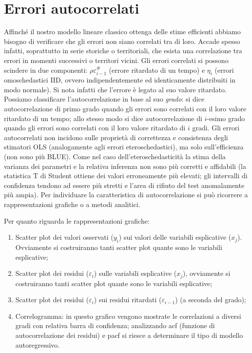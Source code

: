 \documentclass[a4page, 11pt]{article} %
\begin{document}
\section{Errori autocorrelati}

Affinché il nostro modello lineare classico ottenga delle stime efficienti abbiamo bisogno di verificare che gli errori non siano correlati tra di loro.
Accade spesso infatti, soprattutto in serie storiche o territoriali, che esista una correlazione tra errori in momenti successivi o territori vicini.
Gli errori correlati si possono scindere in due componenti: $\rho \varepsilon_{i-1}^{\#}$ (errore ritardato di un tempo) e $\eta_i$ (errori omoschedastici IID, ovvero indipendentemente ed identicamente distribuiti in modo normale).
Si nota infatti che l’errore è legato al suo valore ritardato.
Possiamo classificare l’autocorrelazione in base al suo \textit{grado}: si dice autocorrelazione di primo grado quando gli errori sono correlati con il loro valore ritardato di un tempo; allo stesso modo si dice autocorrelazione di $i$-esimo grado quando gli errori sono correlati con il loro valore ritardato di $i$ gradi. Gli errori autocorrelati non incidono sulle proprietà di correttezza e consistenza degli stimatori OLS (analogamente agli errori eteroschedastici), ma solo sull’efficienza (non sono più BLUE). Come nel caso dell’eteroschedasticità la stima della varianza dei parametri e la relativa inferenza non sono più corretti e affidabili (la statistica T di Student ottiene dei valori erroneamente più elevati; gli intervalli di confidenza tendono ad essere più stretti e l'area di rifiuto del test anomalamente più ampia).
Per individuare la caratteristica di autocorrelazione si può ricorrere a rappresentazioni grafiche o a metodi analitici.

Per quanto riguarda le rappresentazioni grafiche:
\begin{enumerate}[noitemsep]
\item Scatter plot dei valori osservati ($y_i$) sui valori delle variabili esplicative ($x_j$). Ovviamente si costruiranno tanti scatter plot quante sono le variabili esplicative;
\item Scatter plot dei residui ($\varepsilon_i$) sulle variabili esplicative ($x_j$), ovviamente si costruiranno tanti scatter plot quante sono le variabili esplicative;
\item Scatter plot dei residui ($\varepsilon_i$) sui residui ritardati ($\varepsilon_{i-1}$) (a seconda del grado);
\item Correlogramma: in questo grafico vengono mostrate le correlazioni a diversi gradi con relativa barra di confidenza; analizzando acf (funzione di autocorrelazione dei residui) e pacf si riesce a determinare il tipo di modello autoregressivo.\end{enumerate}
\end{document}
